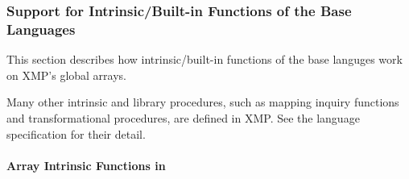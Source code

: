 






\subsubsection{Support for Intrinsic/Built-in Functions of the Base
	  Languages}

This section describes how intrinsic/built-in functions of the base
languges work on XMP's global arrays.

Many other intrinsic and library procedures, such as mapping inquiry
functions and transformational procedures, are defined in XMP. See the
language specification for their detail.

\paragraph{Array Intrinsic Functions in {\XMPF}}

